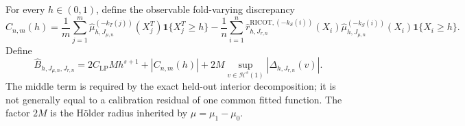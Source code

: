 For every \(h\in(0,1)\), define the observable fold-varying discrepancy
\[
C_{n,m}(h)=\frac1m\sum_{j=1}^m\widehat\mu_{h,J_{\mu,n}}^{(-k_T(j))}(X_j^T)\mathbf 1\{X_j^T\ge h\}-\frac1n\sum_{i=1}^n\widehat r^{\mathrm{RICOT},(-k_S(i))}_{h,J_{r,n}}(X_i)\widehat\mu_{h,J_{\mu,n}}^{(-k_S(i))}(X_i)\mathbf 1\{X_i\ge h\}.
\]
Define
\[
\widehat B_{h,J_{\mu,n},J_{r,n}}=2C_{\mathrm{LP}}Mh^{s+1}+|C_{n,m}(h)|+2M\sup_{v\in\mathcal H^s(1)}|\Delta_{h,J_{r,n}}(v)|.
\]
The middle term is required by the exact held-out interior decomposition; it is not generally equal to a calibration residual of one common fitted function. The factor \(2M\) is the Hölder radius inherited by \(\mu=\mu_1-\mu_0\).